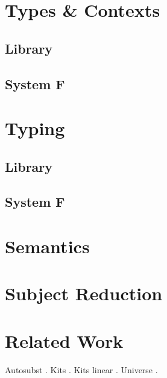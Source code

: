 \documentclass[sigplan,10pt]{acmart}
\begin{document}
  \section{Types \& Contexts}
  \subsection{Library}
  \KTypeSorts
  \KTypes
  \KContextHelper
  \KContexts
  \KContextLookup
  \subsection{System F}
  \FTypes

  \section{Typing}
  \subsection{Library}
  \KVariableTyping
  \KTyping
  \KTypingKit
  \KMapTyping
  \KLiftTyping
  \KSingleTyping
  \KTypingNotation
  \KTypingTraversal
  \KTypingInstances
  \subsection{System F}
  \FTyping
  \FTypingInst
  \FPreserve
  \FTypingTraversal

  \section{Semantics}
  \FReduction

  \section{Subject Reduction}
  \FSubjectReduction
  \FSubjectReductionProofInteresting

  \section{Related Work}
  Autosubst \cite{DBLP:conf/cpp/StarkSK19, DBLP:conf/itp/SchaferTS15}.
  Kits \cite{DBLP:journals/jar/BentonHKM12, unpublished:mcbride2005kits}.
  Kits linear \cite{DBLP:journals/corr/abs-2005-02247}.
  Universe \cite{DBLP:journals/pacmpl/AllaisA0MM18}.

  

  \clearpage
  \appendix
\end{document}
